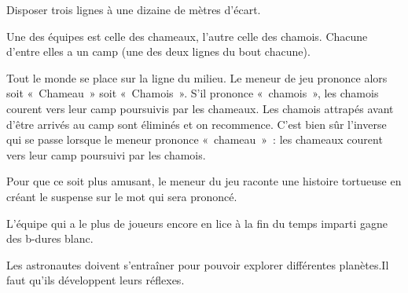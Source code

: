 \documentclass{grand-jeu}
\begin{document}
\begin{liste-materiel}
\end{liste-materiel}

\begin{regles}
Disposer trois lignes à une dizaine de mètres d'écart. 

Une des équipes est celle des chameaux, l’autre celle des chamois. Chacune d’entre elles a un camp (une des deux lignes du bout chacune).

Tout le monde se place sur la ligne du milieu. Le meneur de jeu prononce alors soit « Chameau » soit « Chamois ». S’il prononce « chamois », les chamois courent vers leur camp poursuivis par les chameaux. Les chamois attrapés avant d’être arrivés au camp sont éliminés et on recommence. C’est bien sûr l’inverse qui se passe lorsque le meneur prononce « chameau » : les chameaux courent vers leur camp poursuivi par les chamois.

Pour que ce soit plus amusant, le meneur du jeu raconte une histoire tortueuse en créant le suspense sur le mot qui sera prononcé. 

L'équipe qui a le plus de joueurs encore en lice à la fin du temps imparti gagne des b-dures blanc.
\end{regles}

\begin{imaginaire}
Les astronautes doivent s'entraîner pour pouvoir explorer différentes planètes.Il faut qu'ils développent leurs réflexes. 
\end{imaginaire}

\begin{moments-stop}
\end{moments-stop}
\end{document}
